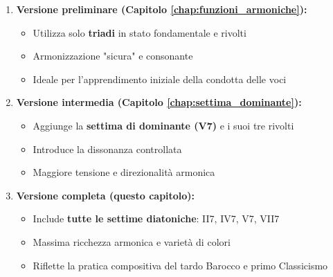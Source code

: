 \begin{definizione}
	\label{def:tre_versioni_complete}
	
	\begin{enumerate}
		\item \textbf{Versione preliminare (Capitolo \ref{chap:funzioni_armoniche}):}
		\begin{itemize}
			\item Utilizza solo \textbf{triadi} in stato fondamentale e rivolti
			\item Armonizzazione "sicura" e consonante
			\item Ideale per l'apprendimento iniziale della condotta delle voci
		\end{itemize}
		
		\item \textbf{Versione intermedia (Capitolo \ref{chap:settima_dominante}):}
		\begin{itemize}
			\item Aggiunge la \textbf{settima di dominante (V7)} e i suoi tre rivolti
			\item Introduce la dissonanza controllata
			\item Maggiore tensione e direzionalità armonica
		\end{itemize}
		
		\item \textbf{Versione completa (questo capitolo):}
		\begin{itemize}
			\item Include \textbf{tutte le settime diatoniche}: II7, IV7, V7, VII7
			\item Massima ricchezza armonica e varietà di colori
			\item Riflette la pratica compositiva del tardo Barocco e primo Classicismo
		\end{itemize}
	\end{enumerate}
\end{definizione}

